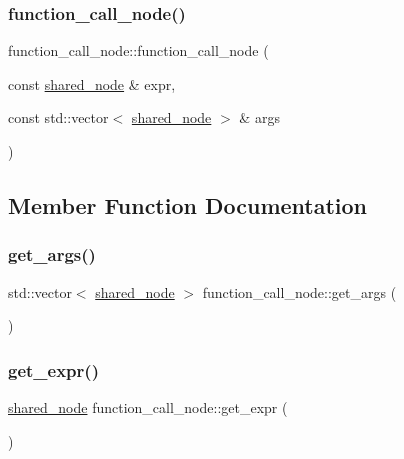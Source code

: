 \subsubsection{\texorpdfstring{function\+\_\+call\+\_\+node()}{function\_call\_node()}\hspace{0.1cm}{\footnotesize\ttfamily [2/2]}}
{\footnotesize\ttfamily function\+\_\+call\+\_\+node\+::function\+\_\+call\+\_\+node (\begin{DoxyParamCaption}\item[{const \hyperlink{namespacejawe_a3f307481d921b6cbb50cc8511fc2b544}{shared\+\_\+node} \&}]{expr,  }\item[{const std\+::vector$<$ \hyperlink{namespacejawe_a3f307481d921b6cbb50cc8511fc2b544}{shared\+\_\+node} $>$ \&}]{args }\end{DoxyParamCaption})}



\subsection{Member Function Documentation}
\mbox{\label{classjawe_1_1function__call__node_a9c8b1370713757589fc05f68eb14aa3e}} 
\subsubsection{\texorpdfstring{get\+\_\+args()}{get\_args()}}
{\footnotesize\ttfamily std\+::vector$<$ \hyperlink{namespacejawe_a3f307481d921b6cbb50cc8511fc2b544}{shared\+\_\+node} $>$ function\+\_\+call\+\_\+node\+::get\+\_\+args (\begin{DoxyParamCaption}{ }\end{DoxyParamCaption})}

\mbox{\label{classjawe_1_1function__call__node_ab9ce2d744923acc3d323605b155d4d78}} 
\subsubsection{\texorpdfstring{get\+\_\+expr()}{get\_expr()}}
{\footnotesize\ttfamily \hyperlink{namespacejawe_a3f307481d921b6cbb50cc8511fc2b544}{shared\+\_\+node} function\+\_\+call\+\_\+node\+::get\+\_\+expr (\begin{DoxyParamCaption}{ }\end{DoxyParamCaption})}

